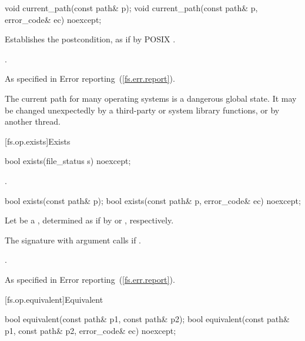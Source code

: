 \begin{itemdecl}
void current_path(const path& p);
void current_path(const path& p, error_code& ec) noexcept;
\end{itemdecl}

\begin{itemdescr}
\pnum
\effects Establishes the postcondition, as if by POSIX .

\pnum
\postcondition {}.

\pnum
\throws As specified in Error reporting~(\ref{fs.err.report}).

\pnum
\begin{note} The current path for many operating systems is a dangerous
  global state. It may be changed unexpectedly by a third-party or system
  library functions, or by another thread. \end{note}
\end{itemdescr}

[fs.op.exists]{Exists}

\begin{itemdecl}
bool exists(file_status s) noexcept;
\end{itemdecl}

\begin{itemdescr}
\pnum
\returns {}.
\end{itemdescr}

\begin{itemdecl}
bool exists(const path& p);
bool exists(const path& p, error_code& ec) noexcept;
\end{itemdecl}

\begin{itemdescr}
\pnum
Let  be a ,
determined as if by  or , respectively.

\pnum
\effects The signature with argument  calls 
if .

\pnum
\returns {}.

\pnum
\throws As specified in Error reporting~(\ref{fs.err.report}).
\end{itemdescr}


[fs.op.equivalent]{Equivalent}

\begin{itemdecl}
bool equivalent(const path& p1, const path& p2);
bool equivalent(const path& p1, const path& p2, error_code& ec) noexcept;
\end{itemdecl}

